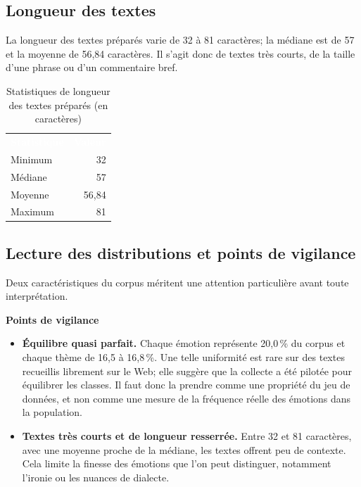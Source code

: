 \documentclass[11pt,a4paper]{article}
\newcommand{\headtab}[1]{\textcolor{white}{\sffamily\bfseries #1}}
\begin{document}
\subsection{Longueur des textes}
La longueur des textes préparés varie de 32 à 81 caractères; la médiane est de 57 et la moyenne de 56,84 caractères. Il s'agit donc de textes très courts, de la taille d'une phrase ou d'un commentaire bref.

\begin{table}[H]
\centering
\caption{Statistiques de longueur des textes préparés (en caractères)}
\begin{tabular}{lr}
\rowcolor{navy}\headtab{Statistique} & \headtab{Valeur} \\
Minimum & 32 \\
Médiane & 57 \\
Moyenne & 56,84 \\
Maximum & 81 \\
\bottomrule
\end{tabular}
\end{table}

\subsection{Lecture des distributions et points de vigilance}
Deux caractéristiques du corpus méritent une attention particulière avant toute interprétation.

\begin{vigilance}
\textbf{\sffamily\color{amber}Points de vigilance}
\begin{itemize}
  \item \textbf{Équilibre quasi parfait.} Chaque émotion représente 20,0\,\% du corpus et chaque thème de 16,5 à 16,8\,\%. Une telle uniformité est rare sur des textes recueillis librement sur le Web; elle suggère que la collecte a été pilotée pour équilibrer les classes. Il faut donc la prendre comme une propriété du jeu de données, et non comme une mesure de la fréquence réelle des émotions dans la population.
  \item \textbf{Textes très courts et de longueur resserrée.} Entre 32 et 81 caractères, avec une moyenne proche de la médiane, les textes offrent peu de contexte. Cela limite la finesse des émotions que l'on peut distinguer, notamment l'ironie ou les nuances de dialecte.
\end{itemize}
\end{vigilance}

\end{document}

